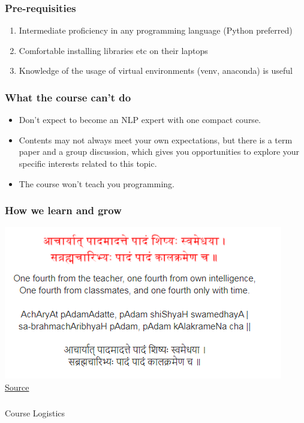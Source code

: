 \documentclass{beamer}
\begin{document}
\begin{frame}
\frametitle{Pre-requisities}
\begin{enumerate}
\item Intermediate proficiency in any programming language (Python preferred)
\item Comfortable installing libraries etc on their laptops
\item Knowledge of the usage of virtual environments (venv, anaconda) is useful
\end{enumerate}
\end{frame}

\begin{frame}
\frametitle{What the course can't do}
\begin{itemize}
\item Don't expect to become an NLP expert with one compact course. 
\item Contents may not always meet your own expectations, but there is a term paper and a group discussion, which gives you opportunities to explore your specific interests related to this topic.
\item The course won't teach you programming. 
\end{itemize}
\end{frame}

\begin{frame}
\frametitle{How we learn and grow}
\includegraphics[width=\textwidth]{figures/acharyat.PNG}
\href{https://blog.practicalsanskrit.com/2009/12/how-we-learn-and-grow.html}{Source}\end{frame}

\begin{frame}
\frametitle{}
\begin{center}
\Large Course Logistics
\end{center}
\end{frame}
\end{document}
